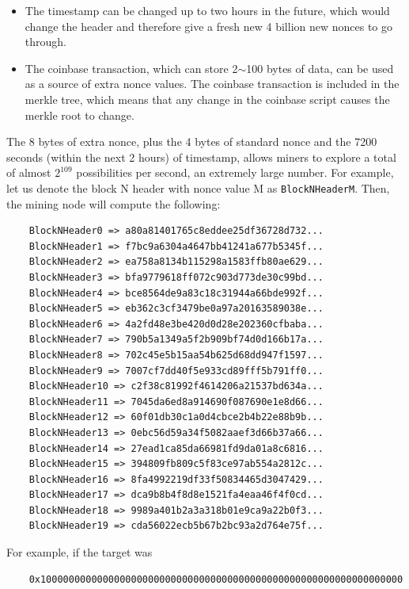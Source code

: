 \documentclass{article}
\newcounter{example}[section]
\begin{document}
    \begin{itemize}
      \item The timestamp can be changed up to two hours in the future, which would change the header and therefore give a fresh new 4 billion new nonces to go through.
      \item The coinbase transaction, which can store 2$\sim$100 bytes of data, can be used as a source of extra nonce values. The coinbase transaction is included in the merkle tree, which means that any change in the coinbase script causes the merkle root to change.
    \end{itemize}

    The 8 bytes of extra nonce, plus the 4 bytes of standard nonce and the 7200 seconds (within the next 2 hours) of timestamp, allows miners to explore a total of almost $2^{109}$ possibilities per second, an extremely large number. For example, let us denote the block N header with nonce value M as \texttt{BlockNHeaderM}. Then, the mining node will compute the following:

    \begin{lstlisting}
    BlockNHeader0 => a80a81401765c8eddee25df36728d732...
    BlockNHeader1 => f7bc9a6304a4647bb41241a677b5345f...
    BlockNHeader2 => ea758a8134b115298a1583ffb80ae629...
    BlockNHeader3 => bfa9779618ff072c903d773de30c99bd...
    BlockNHeader4 => bce8564de9a83c18c31944a66bde992f...
    BlockNHeader5 => eb362c3cf3479be0a97a20163589038e...
    BlockNHeader6 => 4a2fd48e3be420d0d28e202360cfbaba...
    BlockNHeader7 => 790b5a1349a5f2b909bf74d0d166b17a...
    BlockNHeader8 => 702c45e5b15aa54b625d68dd947f1597...
    BlockNHeader9 => 7007cf7dd40f5e933cd89fff5b791ff0...
    BlockNHeader10 => c2f38c81992f4614206a21537bd634a...
    BlockNHeader11 => 7045da6ed8a914690f087690e1e8d66...
    BlockNHeader12 => 60f01db30c1a0d4cbce2b4b22e88b9b...
    BlockNHeader13 => 0ebc56d59a34f5082aaef3d66b37a66...
    BlockNHeader14 => 27ead1ca85da66981fd9da01a8c6816...
    BlockNHeader15 => 394809fb809c5f83ce97ab554a2812c...
    BlockNHeader16 => 8fa4992219df33f50834465d3047429...
    BlockNHeader17 => dca9b8b4f8d8e1521fa4eaa46f4f0cd...
    BlockNHeader18 => 9989a401b2a3a318b01e9ca9a22b0f3...
    BlockNHeader19 => cda56022ecb5b67b2bc93a2d764e75f...
    \end{lstlisting}

    For example, if the target was

    \begin{lstlisting}
    0x1000000000000000000000000000000000000000000000000000000000000000
    \end{lstlisting}
\end{document}
